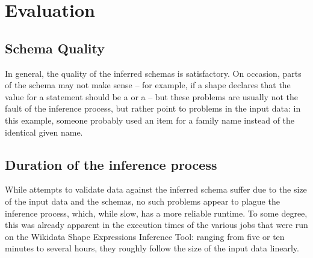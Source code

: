 
\chapter{Evaluation}
\label{ch:Evaluation}


\section{Schema Quality}
\label{sec:Evaluation:quality}

In general, the quality of the inferred schemas is satisfactory.
On occasion, parts of the schema may not make sense –
for example, if a shape declares that the value for a  statement
should be a  or a  –
but these problems are usually not the fault of the inference process,
but rather point to problems in the input data:
in this example, someone probably used an item for a family name
instead of the identical given name. %

\section{Duration of the inference process}
\label{sec:Evaluation:duration}

While attempts to validate data against the inferred schema
suffer due to the size of the input data and the schemas,
no such problems appear to plague the inference process,
which, while slow, has a more reliable runtime.
To some degree, this was already apparent in the execution times
of the various jobs that were run on the Wikidata Shape Expressions Inference Tool:
ranging from five or ten minutes to several hours,
they roughly follow the size of the input data linearly.

